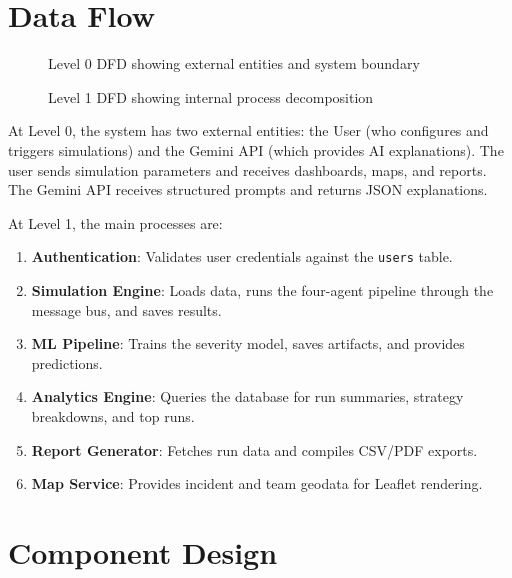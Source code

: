 \section{Data Flow}
\label{sec:data_flow}

\begin{figure}[H]
\centering
{}
\caption{Level 0 DFD showing external entities and system boundary}
\label{fig:dfd_level0}
\end{figure}

\begin{figure}[H]
\centering
{}
\caption{Level 1 DFD showing internal process decomposition}
\label{fig:dfd_level1}
\end{figure}

At Level 0, the system has two external entities: the User (who configures and triggers simulations) and the Gemini API (which provides AI explanations). The user sends simulation parameters and receives dashboards, maps, and reports. The Gemini API receives structured prompts and returns JSON explanations.

At Level 1, the main processes are:

\begin{enumerate}[leftmargin=*]
    \item \textbf{Authentication}: Validates user credentials against the \texttt{users} table.
    \item \textbf{Simulation Engine}: Loads data, runs the four-agent pipeline through the message bus, and saves results.
    \item \textbf{ML Pipeline}: Trains the severity model, saves artifacts, and provides predictions.
    \item \textbf{Analytics Engine}: Queries the database for run summaries, strategy breakdowns, and top runs.
    \item \textbf{Report Generator}: Fetches run data and compiles CSV/PDF exports.
    \item \textbf{Map Service}: Provides incident and team geodata for Leaflet rendering.
\end{enumerate}

\section{Component Design}
\label{sec:component_design}

